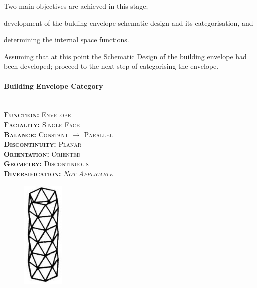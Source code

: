Two main objectives are achieved in this stage; \begin{inparaenum}[a)] \item development of the bulding envelope schematic design and its categorisation, and \item determining the internal space functions.\end{inparaenum}

Assuming that at this point the Schematic Design of the building envelope had been developed; proceed to the next step of categorising the envelope.

\setlength{\columnseprule}{0pt}
\begin{multicols}{2}
	\paragraph{Building Envelope Category}\mbox{}\\
	\vspace {0.5cm}	
	\small \textsc{\textbf{Function:} Envelope\\
	\vspace {0.3cm}
	\textbf{Faciality:} Single Face\\
	\vspace {0.3cm}
	\textbf{Balance:} Constant $\rightarrow$ Parallel\\
	\vspace {0.3cm}
	\textbf{Discontinuity:} Planar\\
	\vspace {0.3cm}
	\textbf{Orientation:} Oriented\\
	\vspace {0.3cm}
	\textbf{Geometry:} Discontinuous\\
	\vspace {0.3cm}
	\textbf{Diversification:} \emph{Not Applicable}\\}
	\normalsize
	\columnbreak
	\vspace{3.5cm}
	\begin{figure}[H]
		\centering
		\includegraphics[width=0.18\textwidth]{./Images/18-Envelope9}
	\end{figure}
\end{multicols}
\vspace{-5mm}

